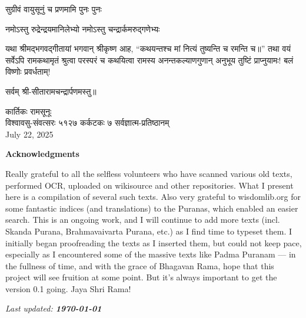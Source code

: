 {सुग्रीवं वायुसूनुं च प्रणमामि पुनः पुनः}

{नमोऽस्तु रुद्रेन्द्रयमानिलेभ्यो नमोऽस्तु चन्द्रार्कमरुद्गणेभ्यः}

यथा श्रीमद्भगवद्\-गीतायां भगवान् श्रीकृष्ण आह, ``कथयन्तश्च मां नित्यं तुष्यन्ति च रमन्ति च॥'' तथा वयं सर्वेऽपि रामकथामृतं श्रुत्वा परस्परं च कथयित्वा रामस्य अनन्तकल्याणगुणान् अनुभूय तुष्टिं प्राप्नुयामः! बलं विष्णोः प्रवर्धताम्!\\



\centerline{सर्वम् श्री-सीतारामचन्द्रार्पणमस्तु॥}
\endgroup
\medskip
{} \hfill कार्तिकः रामसूनूः\\
विश्वावसु-संवत्सरः ५१२७ कर्कटकः ७ \hfill सर्वज्ञात्म-प्रतिष्ठानम्\\
July 22, 2025


\vfill

\centerline{\large \textbf{Acknowledgments}}

\textsf{\scriptsize Really grateful to all the selfless volunteers who have scanned various old texts, performed OCR, uploaded on wikisource and other repositories. What I present here is a compilation of several such texts. Also very grateful to wisdomlib.org for some fantastic indices (and translations) to the Puranas, which enabled an easier search. This is an ongoing work, and I will continue to add more texts (incl. Skanda Purana, Brahmavaivarta Purana, etc.) as I find time to typeset them. I initially began proofreading the texts as I inserted them, but could not keep pace, especially as I encountered some of the massive texts like Padma Puranam --- in the fullness of time, and with the grace of Bhagavan Rama, hope that this project will see fruition at some point. But it's always important to get the version 0.1 going. Jaya Shri Rama!}

\bigskip

\centerline{\textit{\scriptsize Last updated: \textbf{\today}}}
